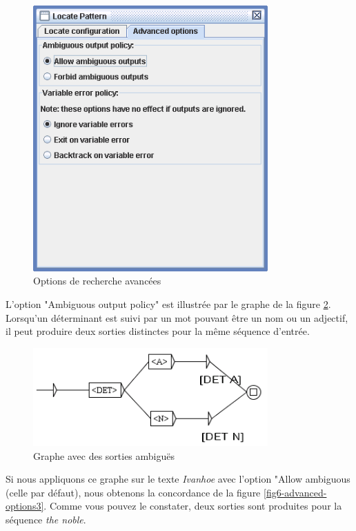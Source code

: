 \bigskip
\begin{figure}[!h]
\begin{center}
\includegraphics[width=9cm]{resources/img/fig6-advanced-options1.png}
\caption{Options de recherche avancées\label{fig6-advanced-options1}}
\end{center}
\end{figure}

\noindent L'option "Ambiguous output policy" est illustrée par le graphe de la 
figure \ref{fig6-advanced-options2}. Lorsqu'un déterminant est suivi par un mot pouvant être un
nom ou un adjectif, il peut produire deux sorties distinctes pour la même séquence d'entrée.


\bigskip
\begin{figure}[!h]
\begin{center}
\includegraphics[width=9cm]{resources/img/fig6-advanced-options2.png}
\caption{Graphe avec des sorties ambiguës\label{fig6-advanced-options2}}
\end{center}
\end{figure}

\noindent Si nous appliquons ce graphe sur le texte \textit{Ivanhoe} avec l'option "Allow ambiguous
(celle par défaut), nous obtenons la concordance de la figure \ref{fig6-advanced-options3}. Comme vous pouvez le constater, deux sorties sont produites pour la séquence \textit{the noble}.

